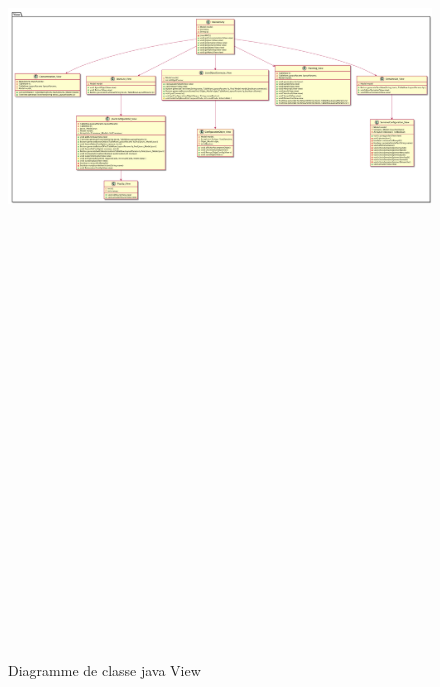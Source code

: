 \documentclass[11pt,a4paper]{report} %
\begin{document}
\begin{landscape}
		\begin{figure}[H]
			\centering
			\includegraphics[width = 25cm ,height = 35cm,keepaspectratio]{./Picture/Diagramme de classe java View.png}
			\caption{Diagramme de classe java View} 
			\label{diagClass}
		\end{figure}
		\newpage
		
		
		\end{landscape}
		
\end{document}
